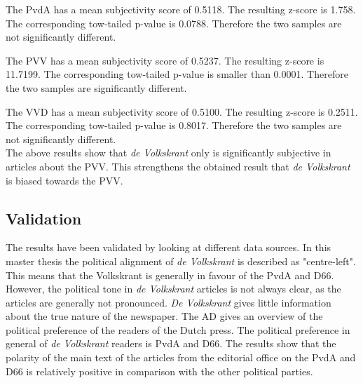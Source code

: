 The PvdA has a mean subjectivity score of 0.5118. The resulting z-score is 1.758. The corresponding tow-tailed p-value is 0.0788. Therefore the two samples are not significantly different.

The PVV has a mean subjectivity score of 0.5237. The resulting z-score is 11.7199. The corresponding tow-tailed p-value is smaller than 0.0001. Therefore the two samples are significantly different.

The VVD has a mean subjectivity score of 0.5100. The resulting z-score is 0.2511. The corresponding tow-tailed p-value is 0.8017. Therefore the two samples are not significantly different. \\

The above results show that {\it de Volkskrant} only is significantly subjective in articles about the PVV. This strengthens the obtained result that {\it de Volkskrant} is biased towards the PVV.

\subsection{Validation}
The results have been validated by looking at different data sources. In this master thesis\cite{Xthesis:volkskrant} the political alignment of {\it de Volkskrant} is described as "centre-left". This means that the Volkskrant is generally in favour of the PvdA and D66. However, the political tone in {\it de Volkskrant} articles is not always clear, as the articles are generally not pronounced. {\it De Volkskrant} gives little information about the true nature of the newspaper. The AD\cite{ad_voters} gives an overview of the political preference of the readers of the Dutch press. The political preference in general of {\it de Volkskrant} readers is PvdA and D66. The results show that the polarity of the main text of the articles from the editorial office on the PvdA and D66 is relatively positive in comparison with the other political parties. \\